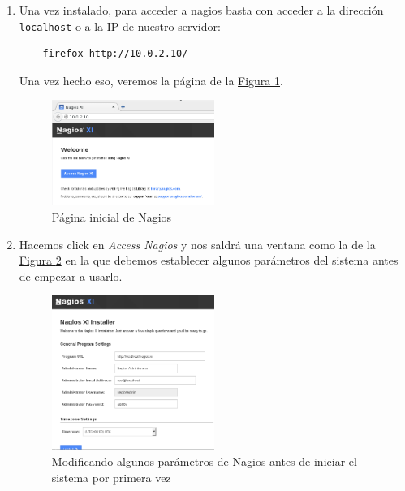 \documentclass[10pt,a4paper,spanish]{article}
\numberwithin{equation}{section} %
\numberwithin{figure}{section} %
\numberwithin{table}{section} %
\begin{document}
\begin{enumerate}[1.]
    \item Una vez instalado, para acceder a nagios basta con acceder a la dirección \texttt{localhost} o a la IP de nuestro servidor:
    \begin{verbatim}
    firefox http://10.0.2.10/
    \end{verbatim}

    Una vez hecho eso, veremos la página de la \hyperref[paginicialnagios]{Figura \ref*{paginicialnagios}}.

    \begin{figure}[!h]
        \centering
        \includegraphics[width=0.5\textwidth]{3_29}
        \caption{Página inicial de Nagios}
        \label{paginicialnagios}
    \end{figure}

    \item Hacemos click en \textit{Access Nagios} y nos saldrá una ventana como la de la \hyperref[ventanainstall]{Figura \ref*{ventanainstall}} en la que debemos establecer algunos parámetros del sistema antes de empezar a usarlo.

    \begin{figure}[!h]
        \centering
        \includegraphics[width=0.5\textwidth]{3_30}
        \caption{Modificando algunos parámetros de Nagios antes de iniciar el sistema por primera vez}
        \label{ventanainstall}
    \end{figure}


\end{enumerate}
\end{document}
